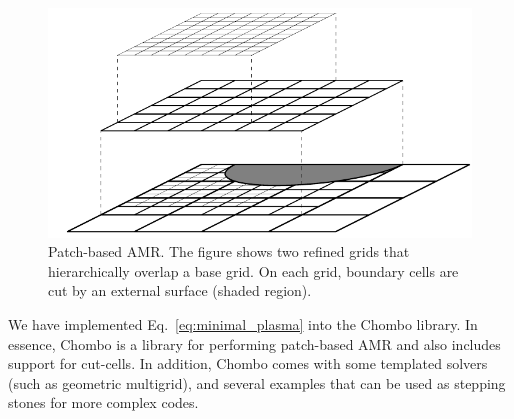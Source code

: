 \documentclass[3p]{elsarticle}
\begin{document}
\begin{figure}[ht]
  \centering
  \includegraphics{./figures/amr2}
  \caption{Patch-based AMR. The figure shows two refined grids that hierarchically overlap a base grid. On each grid, boundary cells are cut by an external surface (shaded region).}
  \label{fig:patch_amr}
\end{figure}



We have implemented Eq.~\eqref{eq:minimal_plasma} into the Chombo library. In essence, Chombo is a library for performing patch-based AMR and also includes support for cut-cells. In addition, Chombo comes with some templated solvers (such as geometric multigrid), and several examples that can be used as stepping stones for more complex codes. 
\end{document}
